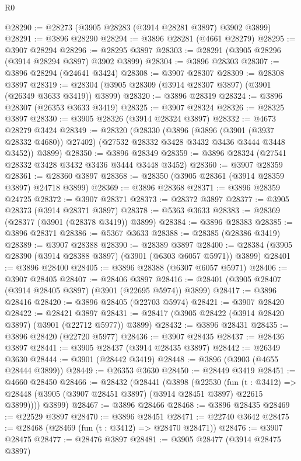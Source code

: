 \begin{lexlean}{R0}
\begin{coremodule}
@28290 := @28273 (@3905 @28283 (@3914 @28281 @3897) @3902 @3899)
@28291 := @3896 @28290
@28294 := @3896 @28281 (@4661 @28279)
@28295 := @3907 @28294
@28296 := @28295 @3897
@28303 := @28291 (@3905 @28296 (@3914 @28294 @3897) @3902 @3899)
@28304 := @3896 @28303
@28307 := @3896 @28294 (@24641 @3424)
@28308 := @3907 @28307
@28309 := @28308 @3897
@28319 := @28304 (@3905 @28309 (@3914 @28307 @3897) (@3901 (@26349 @3633 @3419)) @3899)
@28320 := @3896 @28319
@28324 := @3896 @28307 (@26353 @3633 @3419)
@28325 := @3907 @28324
@28326 := @28325 @3897
@28330 := @3905 @28326 (@3914 @28324 @3897)
@28332 := @4673 @28279 @3424
@28349 := @28320
    (@28330
      (@3896
        (@3896 (@3901 (@3937 @28332 @4680)) @27402)
        (@27532 @28332 @3428 @3432 @3436 @3444 @3448 @3452))
      @3899)
@28350 := @3896 @28349
@28359 := @3896 @28324 (@27541 @28332 @3428 @3432 @3436 @3444 @3448 @3452)
@28360 := @3907 @28359
@28361 := @28360 @3897
@28368 := @28350 (@3905 @28361 (@3914 @28359 @3897) @24718 @3899)
@28369 := @3896 @28368
@28371 := @3896 @28359 @24725
@28372 := @3907 @28371
@28373 := @28372 @3897
@28377 := @3905 @28373 (@3914 @28371 @3897)
@28378 := @5363 @3633
@28383 := @28369 (@28377 (@3901 (@28378 @3419)) @3899)
@28384 := @3896 @28383
@28385 := @3896 @28371
@28386 := @5367 @3633
@28388 := @28385 (@28386 @3419)
@28389 := @3907 @28388
@28390 := @28389 @3897
@28400 := @28384 (@3905 @28390 (@3914 @28388 @3897) (@3901 (@6303 @6057 @5971)) @3899)
@28401 := @3896 @28400
@28405 := @3896 @28388 (@6307 @6057 @5971)
@28406 := @3907 @28405
@28407 := @28406 @3897
@28416 := @28401 (@3905 @28407 (@3914 @28405 @3897) (@3901 (@22695 @5974)) @3899)
@28417 := @3896 @28416
@28420 := @3896 @28405 (@22703 @5974)
@28421 := @3907 @28420
@28422 := @28421 @3897
@28431 := @28417 (@3905 @28422 (@3914 @28420 @3897) (@3901 (@22712 @5977)) @3899)
@28432 := @3896 @28431
@28435 := @3896 @28420 (@22720 @5977)
@28436 := @3907 @28435
@28437 := @28436 @3897
@28441 := @3905 @28437 (@3914 @28435 @3897)
@28442 := @26349 @3630
@28444 := @3901 (@28442 @3419)
@28448 := @3896 (@3903 (@4655 @28444 @3899))
@28449 := @26353 @3630
@28450 := @28449 @3419
@28451 := @4660 @28450
@28466 := @28432
    (@28441
      (@3898
        (@22530
          (fun (t : @3412) =>
          @28448 (@3905 (@3907 @28451 @3897) (@3914 @28451 @3897) @22615 @3899))))
      @3899)
@28467 := @3896 @28466
@28468 := @3896 @28435
@28469 := @22529 @3897
@28470 := @3896 @28451
@28471 := @22740 @3642
@28475 := @28468 (@28469 (fun (t : @3412) => @28470 @28471))
@28476 := @3907 @28475
@28477 := @28476 @3897
@28481 := @3905 @28477 (@3914 @28475 @3897)

\end{coremodule}
\end{lexlean}
